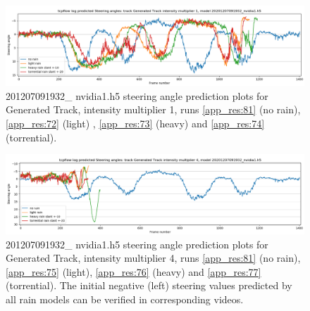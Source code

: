 
\begin{figure}[h!]
 \centering 
 \includegraphics[width=\textwidth]{Figures/sa_GeneratedTrackintensitymultiplier1_20201207091932_nvidia1.h5.png}
 \caption{201207091932\_ nvidia1.h5 steering angle prediction plots for Generated Track, intensity multiplier 1, runs \ref{app_res:81} (no rain), \ref{app_res:72} (light) , \ref{app_res:73} (heavy) and  \ref{app_res:74} (torrential).}
 \label{fig:sa_GeneratedTrackintensitymultiplier1_20201207091932_nvidia1} 
\end{figure}


\begin{figure}[h!]
 \centering 
 \includegraphics[width=\textwidth]{Figures/sa_GeneratedTrackintensitymultiplier4_20201207091932_nvidia1.h5.png}
 \caption{201207091932\_ nvidia1.h5 steering angle prediction plots for Generated Track, intensity multiplier 4, runs \ref{app_res:81} (no rain),  \ref{app_res:75} (light), \ref{app_res:76} (heavy) and \ref{app_res:77} (torrential). The initial negative (left) steering values predicted by all rain models can be verified in corresponding videos.}
 \label{fig:sa_GeneratedTrackintensitymultiplier4_20201207091932_nvidia1} 
\end{figure}


